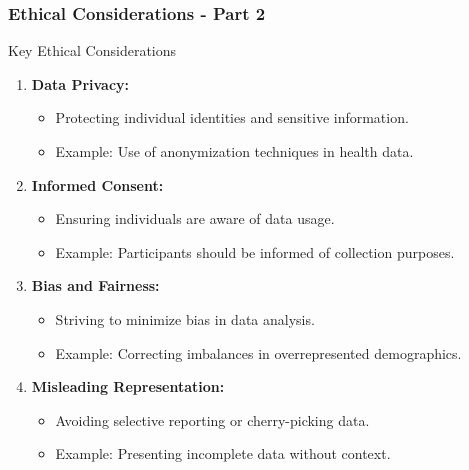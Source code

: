 \documentclass[aspectratio=169]{beamer}
\begin{document}
\begin{frame}[fragile]
    \frametitle{Ethical Considerations - Part 2}
    \begin{block}{Key Ethical Considerations}
        \begin{enumerate}
            \item \textbf{Data Privacy:}
            \begin{itemize}
                \item Protecting individual identities and sensitive information.
                \item Example: Use of anonymization techniques in health data.
            \end{itemize}

            \item \textbf{Informed Consent:}
            \begin{itemize}
                \item Ensuring individuals are aware of data usage.
                \item Example: Participants should be informed of collection purposes.
            \end{itemize}

            \item \textbf{Bias and Fairness:}
            \begin{itemize}
                \item Striving to minimize bias in data analysis.
                \item Example: Correcting imbalances in overrepresented demographics.
            \end{itemize}

            \item \textbf{Misleading Representation:}
            \begin{itemize}
                \item Avoiding selective reporting or cherry-picking data.
                \item Example: Presenting incomplete data without context.
            \end{itemize}
        \end{enumerate}
    \end{block}
\end{frame}
\end{document}
